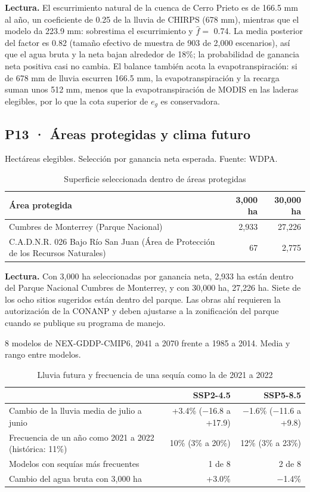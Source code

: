 \documentclass[11pt,letterpaper]{article}
\newcommand{\lectura}[1]{\par\noindent\textcolor{naranja}{\textbf{Lectura.}} #1\par}
\begin{document}
\lectura{El escurrimiento natural de la cuenca de Cerro Prieto es de 166.5 mm al año, un coeficiente de 0.25 de la lluvia de CHIRPS (678 mm), mientras que el modelo da 223.9 mm: sobrestima el escurrimiento y $\hat f=$ 0.74. La media posterior del factor es 0.82 (tamaño efectivo de muestra de 903 de 2,000 escenarios), así que el agua bruta y la neta bajan alrededor de 18\%; la probabilidad de ganancia neta positiva casi no cambia. El balance también acota la evapotranspiración: si de 678 mm de lluvia escurren 166.5 mm, la evapotranspiración y la recarga suman unos 512 mm, menos que la evapotranspiración de MODIS en las laderas elegibles, por lo que la cota superior de $e_g$ es conservadora.}

\subsection{P13 · Áreas protegidas y clima futuro}\label{res:p13}

\begin{table}[H]\centering\small
\caption{Superficie seleccionada dentro de áreas protegidas}\label{tab:anp}
{\color{gris}Hectáreas elegibles. Selección por ganancia neta esperada. Fuente: WDPA.\par}\smallskip
\begin{tabularx}{\linewidth}{Xrr}
\toprule
Área protegida & 3,000 ha & 30,000 ha \\
\midrule
Cumbres de Monterrey (Parque Nacional) & 2,933 & 27,226 \\
C.A.D.N.R. 026 Bajo Río San Juan (Área de Protección de los Recursos Naturales) & 67 & 2,775 \\
\bottomrule
\end{tabularx}
\end{table}

\lectura{Con 3,000 ha seleccionadas por ganancia neta, 2,933 ha están dentro del Parque Nacional Cumbres de Monterrey, y con 30,000 ha, 27,226 ha. Siete de los ocho sitios sugeridos están dentro del parque. Las obras ahí requieren la autorización de la CONANP y deben ajustarse a la zonificación del parque cuando se publique su programa de manejo.}

\begin{table}[H]\centering\small
\caption{Lluvia futura y frecuencia de una sequía como la de 2021 a 2022}\label{tab:clima}
{\color{gris}8 modelos de NEX-GDDP-CMIP6, 2041 a 2070 frente a 1985 a 2014. Media y rango entre modelos.\par}\smallskip
\begin{tabularx}{\linewidth}{Xrr}
\toprule
 & SSP2-4.5 & SSP5-8.5 \\
\midrule
Cambio de la lluvia media de julio a junio & +3.4\% (−16.8 a +17.9) & −1.6\% (−11.6 a +9.8) \\
Frecuencia de un año como 2021 a 2022 (histórica: 11\%) & 10\% (3\% a 20\%) & 12\% (3\% a 23\%) \\
Modelos con sequías más frecuentes & 1 de 8 & 2 de 8 \\
Cambio del agua bruta con 3,000 ha & +3.0\% & −1.4\% \\
\bottomrule
\end{tabularx}
\end{table}
\end{document}
